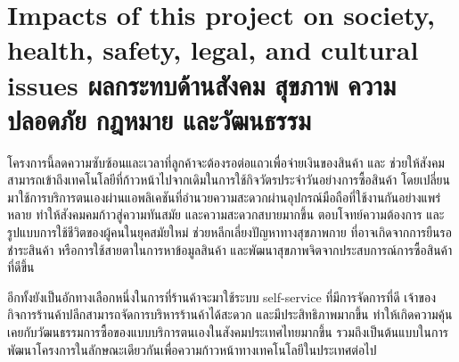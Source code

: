 \section{\ifenglish%
      Impacts of this project on society, health, safety, legal, and cultural issues
  \else%
      ผลกระทบด้านสังคม สุขภาพ ความปลอดภัย กฎหมาย และวัฒนธรรม
  \fi}

\par โครงการนี้ลดความซับซ้อนและเวลาที่ลูกค้าจะต้องรอต่อแถวเพื่อจ่ายเงินของสินค้า
และ ช่วยให้สังคมสามารถเข้าถึงเทคโนโลยีที่ก้าวหน้าไปจากเดิมในการใช้กิจวัตรประจำวันอย่างการซื้อสินค้า
โดยเปลี่ยนมาใช้การบริการตนเองผ่านแอพลิเคชันที่อำนวยความสะดวกผ่านอุปกรณ์มือถือที่ใช้งานกันอย่างแพร่หลาย
ทำให้สังคมคมก้าวสู่ความทันสมัย และความสะดวกสบายมากขึ้น ตอบโจทย์ความต้องการ และรูปแบบการใช้ชีวิตของผู้คนในยุคสมัยใหม่
ช่วยหลีกเลี่ยงปัญหาทางสุขภาพกาย ที่อาจเกิดจากการยืนรอชำระสินค้า หรือการใช้สายตาในการหาข้อมูลสินค้า
และพัฒนาสุขภาพจิตจากประสบการณ์การซื้อสินค้าที่ดีขึ้น
\par อีกทั้งยังเป็นอักทางเลือกหนึ่งในการที่ร้านค้าจะมาใช้ระบบ self-service ที่มีการจัดการที่ดี
เจ้าของกิจการร้านค้าปลีกสามารถจัดการบริหารร้านค้าได้สะดวก
และมีประสิทธิภาพมากขึ้น ทำให้เกิดความคุ้นเคยกับวัฒนธรรมการซื้อของแบบบริการตนเองในสังคมประเทศไทยมากขึ้น
รวมถึงเป็นต้นแบบในการพัฒนาโครงการในลักษณะเดียวกันเพื่อความก้าวหน้าทางเทคโนโลยีในประเทศต่อไป